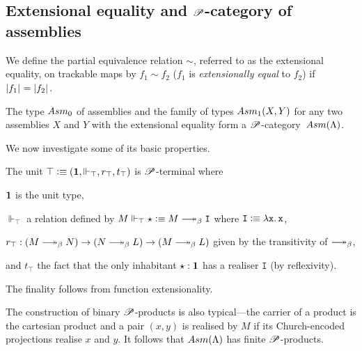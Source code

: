 \documentclass[a4paper,UKenglish,numberwithinsect,cleveref,thm-restate]{lipics-v2021}
\numberwithin{equation}{section}
\theoremstyle{definition}
\theoremstyle{plain}
\begin{document}



\subsection{Extensional equality and \texorpdfstring{$\mathscr{P}$}{P}-category of assemblies}

We define the partial equivalence relation $\sim$, referred to as the extensional equality, on trackable maps by $f_1 \sim f_2$ ($f_1$ is \emph{extensionally equal} to $f_2$) if $\mathopen{}\left|f_1\right|_{}^{}\mathclose{} = \mathopen{}\left|f_2\right|_{}^{}\mathclose{}$.
\begin{proposition}
  The type $\Asm_0$ of assemblies and the family of types $\Asm_1(X, Y)$ for any two assemblies $X$ and $Y$ with the extensional equality form a $\mathscr{P}$-category~$\Asm(\Lambda)$.
\end{proposition}

We now investigate some of its basic properties.
\begin{example}
  The unit $\top \vcentcolon\equiv (\mathbf{1}, \Vdash_\top, r_\top, t_\top)$ is $\mathscr{P}$-terminal where 
  \begin{romanenumerate}
    \item $\mathbf{1}$ is the unit type,  
    \item $\Vdash_\top$ a relation defined by $M \Vdash_\top \star \defeq M \reduce \mathtt{I}$ where $\mathtt{I} \vcentcolon\equiv \mathtt{\lambda x.\, x}$, 
    \item $r_\top : (M \reduce N) \to (N \reduce L) \to (M \reduce L)$ given by the transitivity of $\reduce$,
    \item and $t_\top$ the fact that the only inhabitant $\star : \mathbf{1}$ has a realiser $\mathtt{I}$ (by reflexivity).
  \end{romanenumerate}
  The finality follows from function extensionality.
\end{example}
The construction of binary $\mathscr{P}$-products is also typical---the carrier of a product is the cartesian product and a pair $(x, y)$ is realised by $M$ if its Church-encoded projections realise $x$ and $y$.
It follows that $\Asm(\Lambda)$ has finite $\mathscr{P}$-products.
\end{document}
